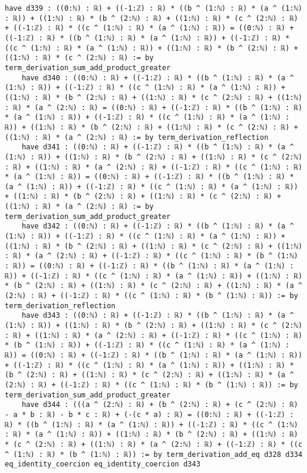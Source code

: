 \documentclass{article}
\begin{document}
\begin{tcolorbox}[colback=white!10, width=\linewidth]
\begin{lstlisting}[language=Lean4]
    have d339 : ((0:ℕ) : ℝ) + ((-1:ℤ) : ℝ) * ((b ^ (1:ℕ) : ℝ) * (a ^ (1:ℕ) : ℝ)) + ((1:ℕ) : ℝ) * (b ^ (2:ℕ) : ℝ) + ((1:ℕ) : ℝ) * (c ^ (2:ℕ) : ℝ) + ((-1:ℤ) : ℝ) * ((c ^ (1:ℕ) : ℝ) * (a ^ (1:ℕ) : ℝ)) = ((0:ℕ) : ℝ) + ((-1:ℤ) : ℝ) * ((b ^ (1:ℕ) : ℝ) * (a ^ (1:ℕ) : ℝ)) + ((-1:ℤ) : ℝ) * ((c ^ (1:ℕ) : ℝ) * (a ^ (1:ℕ) : ℝ)) + ((1:ℕ) : ℝ) * (b ^ (2:ℕ) : ℝ) + ((1:ℕ) : ℝ) * (c ^ (2:ℕ) : ℝ) := by term_derivation_sum_add_product_greater
    have d340 : ((0:ℕ) : ℝ) + ((-1:ℤ) : ℝ) * ((b ^ (1:ℕ) : ℝ) * (a ^ (1:ℕ) : ℝ)) + ((-1:ℤ) : ℝ) * ((c ^ (1:ℕ) : ℝ) * (a ^ (1:ℕ) : ℝ)) + ((1:ℕ) : ℝ) * (b ^ (2:ℕ) : ℝ) + ((1:ℕ) : ℝ) * (c ^ (2:ℕ) : ℝ) + ((1:ℕ) : ℝ) * (a ^ (2:ℕ) : ℝ) = ((0:ℕ) : ℝ) + ((-1:ℤ) : ℝ) * ((b ^ (1:ℕ) : ℝ) * (a ^ (1:ℕ) : ℝ)) + ((-1:ℤ) : ℝ) * ((c ^ (1:ℕ) : ℝ) * (a ^ (1:ℕ) : ℝ)) + ((1:ℕ) : ℝ) * (b ^ (2:ℕ) : ℝ) + ((1:ℕ) : ℝ) * (c ^ (2:ℕ) : ℝ) + ((1:ℕ) : ℝ) * (a ^ (2:ℕ) : ℝ) := by term_derivation_reflection
    have d341 : ((0:ℕ) : ℝ) + ((-1:ℤ) : ℝ) * ((b ^ (1:ℕ) : ℝ) * (a ^ (1:ℕ) : ℝ)) + ((1:ℕ) : ℝ) * (b ^ (2:ℕ) : ℝ) + ((1:ℕ) : ℝ) * (c ^ (2:ℕ) : ℝ) + ((1:ℕ) : ℝ) * (a ^ (2:ℕ) : ℝ) + ((-1:ℤ) : ℝ) * ((c ^ (1:ℕ) : ℝ) * (a ^ (1:ℕ) : ℝ)) = ((0:ℕ) : ℝ) + ((-1:ℤ) : ℝ) * ((b ^ (1:ℕ) : ℝ) * (a ^ (1:ℕ) : ℝ)) + ((-1:ℤ) : ℝ) * ((c ^ (1:ℕ) : ℝ) * (a ^ (1:ℕ) : ℝ)) + ((1:ℕ) : ℝ) * (b ^ (2:ℕ) : ℝ) + ((1:ℕ) : ℝ) * (c ^ (2:ℕ) : ℝ) + ((1:ℕ) : ℝ) * (a ^ (2:ℕ) : ℝ) := by term_derivation_sum_add_product_greater
    have d342 : ((0:ℕ) : ℝ) + ((-1:ℤ) : ℝ) * ((b ^ (1:ℕ) : ℝ) * (a ^ (1:ℕ) : ℝ)) + ((-1:ℤ) : ℝ) * ((c ^ (1:ℕ) : ℝ) * (a ^ (1:ℕ) : ℝ)) + ((1:ℕ) : ℝ) * (b ^ (2:ℕ) : ℝ) + ((1:ℕ) : ℝ) * (c ^ (2:ℕ) : ℝ) + ((1:ℕ) : ℝ) * (a ^ (2:ℕ) : ℝ) + ((-1:ℤ) : ℝ) * ((c ^ (1:ℕ) : ℝ) * (b ^ (1:ℕ) : ℝ)) = ((0:ℕ) : ℝ) + ((-1:ℤ) : ℝ) * ((b ^ (1:ℕ) : ℝ) * (a ^ (1:ℕ) : ℝ)) + ((-1:ℤ) : ℝ) * ((c ^ (1:ℕ) : ℝ) * (a ^ (1:ℕ) : ℝ)) + ((1:ℕ) : ℝ) * (b ^ (2:ℕ) : ℝ) + ((1:ℕ) : ℝ) * (c ^ (2:ℕ) : ℝ) + ((1:ℕ) : ℝ) * (a ^ (2:ℕ) : ℝ) + ((-1:ℤ) : ℝ) * ((c ^ (1:ℕ) : ℝ) * (b ^ (1:ℕ) : ℝ)) := by term_derivation_reflection
    have d343 : ((0:ℕ) : ℝ) + ((-1:ℤ) : ℝ) * ((b ^ (1:ℕ) : ℝ) * (a ^ (1:ℕ) : ℝ)) + ((1:ℕ) : ℝ) * (b ^ (2:ℕ) : ℝ) + ((1:ℕ) : ℝ) * (c ^ (2:ℕ) : ℝ) + ((1:ℕ) : ℝ) * (a ^ (2:ℕ) : ℝ) + ((-1:ℤ) : ℝ) * ((c ^ (1:ℕ) : ℝ) * (b ^ (1:ℕ) : ℝ)) + ((-1:ℤ) : ℝ) * ((c ^ (1:ℕ) : ℝ) * (a ^ (1:ℕ) : ℝ)) = ((0:ℕ) : ℝ) + ((-1:ℤ) : ℝ) * ((b ^ (1:ℕ) : ℝ) * (a ^ (1:ℕ) : ℝ)) + ((-1:ℤ) : ℝ) * ((c ^ (1:ℕ) : ℝ) * (a ^ (1:ℕ) : ℝ)) + ((1:ℕ) : ℝ) * (b ^ (2:ℕ) : ℝ) + ((1:ℕ) : ℝ) * (c ^ (2:ℕ) : ℝ) + ((1:ℕ) : ℝ) * (a ^ (2:ℕ) : ℝ) + ((-1:ℤ) : ℝ) * ((c ^ (1:ℕ) : ℝ) * (b ^ (1:ℕ) : ℝ)) := by term_derivation_sum_add_product_greater
    have d344 : (((a ^ (2:ℕ) : ℝ) + (b ^ (2:ℕ) : ℝ) + (c ^ (2:ℕ) : ℝ) - a * b : ℝ) - b * c : ℝ) + (-(c * a) : ℝ) = ((0:ℕ) : ℝ) + ((-1:ℤ) : ℝ) * ((b ^ (1:ℕ) : ℝ) * (a ^ (1:ℕ) : ℝ)) + ((-1:ℤ) : ℝ) * ((c ^ (1:ℕ) : ℝ) * (a ^ (1:ℕ) : ℝ)) + ((1:ℕ) : ℝ) * (b ^ (2:ℕ) : ℝ) + ((1:ℕ) : ℝ) * (c ^ (2:ℕ) : ℝ) + ((1:ℕ) : ℝ) * (a ^ (2:ℕ) : ℝ) + ((-1:ℤ) : ℝ) * ((c ^ (1:ℕ) : ℝ) * (b ^ (1:ℕ) : ℝ)) := by term_derivation_add_eq d328 d334 eq_identity_coercion eq_identity_coercion d343

\end{lstlisting}
\end{tcolorbox}
\end{document}
